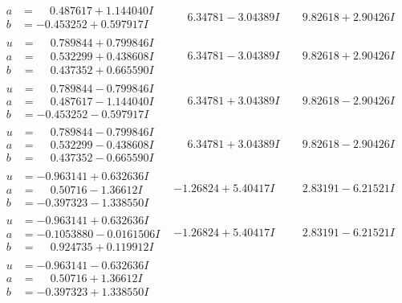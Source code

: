 \documentclass[1p]{elsarticle_modified}
\theoremstyle{definition}
\begin{document}
$$\begin{array}{c|c|c}
\begin{aligned}
a &= \phantom{-}0.487617 + 1.144040 I \\
b &= -0.453252 + 0.597917 I\end{aligned}
 & \phantom{-}6.34781 - 3.04389 I & \phantom{-}9.82618 + 2.90426 I \\ \hline\begin{aligned}
u &= \phantom{-}0.789844 + 0.799846 I \\
a &= \phantom{-}0.532299 + 0.438608 I \\
b &= \phantom{-}0.437352 + 0.665590 I\end{aligned}
 & \phantom{-}6.34781 - 3.04389 I & \phantom{-}9.82618 + 2.90426 I \\ \hline\begin{aligned}
u &= \phantom{-}0.789844 - 0.799846 I \\
a &= \phantom{-}0.487617 - 1.144040 I \\
b &= -0.453252 - 0.597917 I\end{aligned}
 & \phantom{-}6.34781 + 3.04389 I & \phantom{-}9.82618 - 2.90426 I \\ \hline\begin{aligned}
u &= \phantom{-}0.789844 - 0.799846 I \\
a &= \phantom{-}0.532299 - 0.438608 I \\
b &= \phantom{-}0.437352 - 0.665590 I\end{aligned}
 & \phantom{-}6.34781 + 3.04389 I & \phantom{-}9.82618 - 2.90426 I \\ \hline\begin{aligned}
u &= -0.963141 + 0.632636 I \\
a &= \phantom{-}0.50716 - 1.36612 I \\
b &= -0.397323 - 1.338550 I\end{aligned}
 & -1.26824 + 5.40417 I & \phantom{-}2.83191 - 6.21521 I \\ \hline\begin{aligned}
u &= -0.963141 + 0.632636 I \\
a &= -0.1053880 - 0.0161506 I \\
b &= \phantom{-}0.924735 + 0.119912 I\end{aligned}
 & -1.26824 + 5.40417 I & \phantom{-}2.83191 - 6.21521 I \\ \hline\begin{aligned}
u &= -0.963141 - 0.632636 I \\
a &= \phantom{-}0.50716 + 1.36612 I \\
b &= -0.397323 + 1.338550 I\end{aligned}

\end{array}$$
\end{document}
